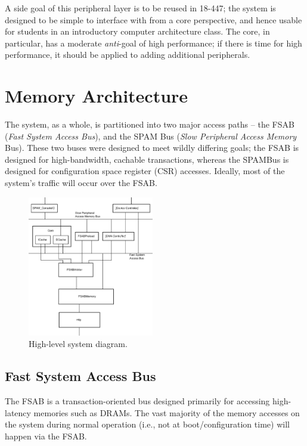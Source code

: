 \documentclass[10pt,twocolumn]{article}
\begin{document}
A side goal of this peripheral layer is to be reused in 18-447; the system
is designed to be simple to interface with from a core perspective, and
hence usable for students in an introductory computer architecture class. 
The core, in particular, has a moderate \textit{anti}-goal of high
performance; if there is time for high performance, it should be applied to
adding additional peripherals.

\section{Memory Architecture}

The system, as a whole, is partitioned into two major access paths -- the
FSAB (\textit{Fast System Access Bus}), and the SPAM Bus (\textit{Slow
Peripheral Access Memory} Bus).  These two buses were designed to meet
wildly differing goals; the FSAB is designed for high-bandwidth, cachable
transactions, whereas the SPAMBus is designed for configuration space
register (CSR) accesses.  Ideally, most of the system's traffic will occur
over the FSAB.

\begin{figure}
  \centering
    \includegraphics[width=0.49\textwidth]{block_diagram.pdf}
  \caption{High-level system diagram.} \label{system_diagram}
\end{figure}

\subsection{Fast System Access Bus}

The FSAB is a transaction-oriented bus designed primarily for accessing
high-latency memories such as DRAMs. The vast majority of the memory
accesses on the system during normal operation (i.e., not at
boot/configuration time) will happen via the FSAB.
\end{document}
